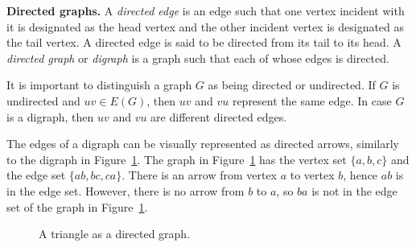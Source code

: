\begin{definition}
\textbf{Directed graphs.}
A \emph{directed edge} is an edge such that one vertex incident with it
is designated as the head vertex and the other incident vertex is
designated as the tail vertex. A directed edge is said to be directed
from its tail to its head. A \emph{directed graph} or \emph{digraph} is
a graph such that each of whose edges is directed.
\end{definition}

It is important to distinguish a graph $G$ as being directed or
undirected. If $G$ is undirected and $uv \in E(G)$, then $uv$ and $vu$
represent the same edge. In case $G$ is a digraph, then $uv$ and $vu$
are different directed edges.

The edges of a digraph can be visually represented as directed arrows,
similarly to the digraph in
Figure~\ref{fig:introduction:directed_triangle_graph}. The graph in
Figure~\ref{fig:introduction:directed_triangle_graph} has the vertex
set $\{ a, b, c \}$ and the edge set $\{ ab, bc, ca \}$. There is an
arrow from vertex $a$ to vertex $b$, hence $ab$ is in the edge
set. However, there is no arrow from $b$ to $a$, so $ba$ is not in the
edge set of the graph in
Figure~\ref{fig:introduction:directed_triangle_graph}.

\begin{figure}[!htbp]
\centering
{}
\caption{A triangle as a directed graph.}
\label{fig:introduction:directed_triangle_graph}
\end{figure}

